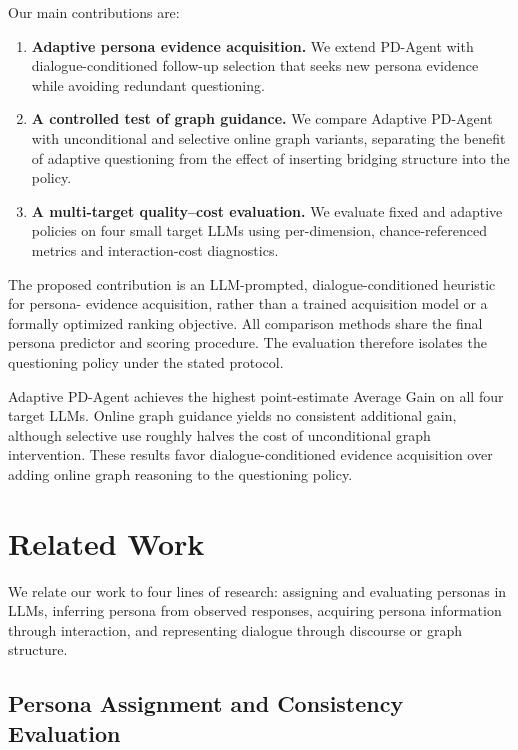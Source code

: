 \documentclass{ieeeaccess}
\begin{document}
Our main contributions are:
\begin{enumerate}
    \item \textbf{Adaptive persona evidence acquisition.} We extend PD-Agent with
    dialogue-conditioned follow-up selection that seeks new persona evidence while avoiding
    redundant questioning.
    \item \textbf{A controlled test of graph guidance.} We compare Adaptive PD-Agent with
    unconditional and selective online graph variants, separating the benefit of adaptive
    questioning from the effect of inserting bridging structure into the policy.
    \item \textbf{A multi-target quality--cost evaluation.} We evaluate fixed and adaptive
    policies on four small target LLMs using per-dimension, chance-referenced metrics and
    interaction-cost diagnostics.
\end{enumerate}

The proposed contribution is an LLM-prompted, dialogue-conditioned heuristic for persona-
evidence acquisition, rather than a trained acquisition model or a formally optimized ranking
objective. All comparison methods share the final persona predictor and scoring procedure. The
evaluation therefore isolates the questioning policy under the stated protocol.

Adaptive PD-Agent achieves the highest point-estimate Average Gain on all four target LLMs. Online graph
guidance yields no consistent additional gain, although selective use roughly halves the
cost of unconditional graph intervention. These results favor dialogue-conditioned evidence
acquisition over adding online graph reasoning to the questioning policy.

\section{Related Work}

We relate our work to four lines of research: assigning and evaluating personas in LLMs,
inferring persona from observed responses, acquiring persona information through interaction,
and representing dialogue through discourse or graph structure.

\subsection{Persona Assignment and Consistency Evaluation}
\end{document}
